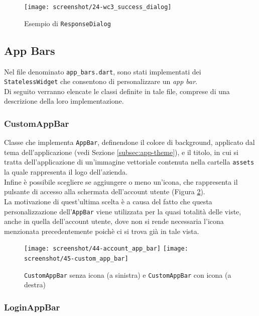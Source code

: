 \begin{figure}[!h] 
    \centering 
    \texttt{[image: screenshot/24-wc3\_success\_dialog]} 
    \caption{Esempio di \lstinline{ResponseDialog}}
    \label{fig:response-dialog}
\end{figure}

\subsection{App Bars}
\label{subsec:app-bars}

Nel file denominato \lstinline{app_bars.dart}, sono stati implementati dei \lstinline{StatelessWidget} che consentono di personalizzare un \emph{app bar}.\\
Di seguito verranno elencate le classi definite in tale file, comprese di una descrizione della loro implementazione.

\subsubsection*{CustomAppBar}
\label{subsubsec:custom-app-bar}

Classe che implementa \lstinline{AppBar}, \cite{site:app-bar} definendone il colore di background, applicato dal tema dell'applicazione (vedi Sezione \ref{subsec:app-theme}), e il titolo, in cui si tratta dell'applicazione di un'immagine vettoriale contenuta nella cartella \lstinline{assets} la quale rappresenta il logo dell'azienda.\\
Infine è possibile scegliere se aggiungere o meno un'icona, che rappresenta il pulsante di accesso alla schermata dell'account utente (Figura \ref{fig:custom-app-bar}).\\
La motivazione di quest'ultima scelta è a causa del fatto che questa personalizzazione dell'\lstinline{AppBar} viene utilizzata per la quasi totalità delle viste, anche in quella dell'account utente, dove non si rende necessaria l'icona menzionata precedentemente poichè ci si trova già in tale vista.

\begin{figure}[!h] 
    \centering 
    \texttt{[image: screenshot/44-account\_app\_bar]}
    \hfill
    \texttt{[image: screenshot/45-custom\_app\_bar]} 
    \caption{\lstinline{CustomAppBar} senza icona (a sinistra) e \lstinline{CustomAppBar} con icona (a destra)}
    \label{fig:custom-app-bar}
\end{figure}

\subsubsection*{LoginAppBar}
\label{subsubsec:login-app-bar}

